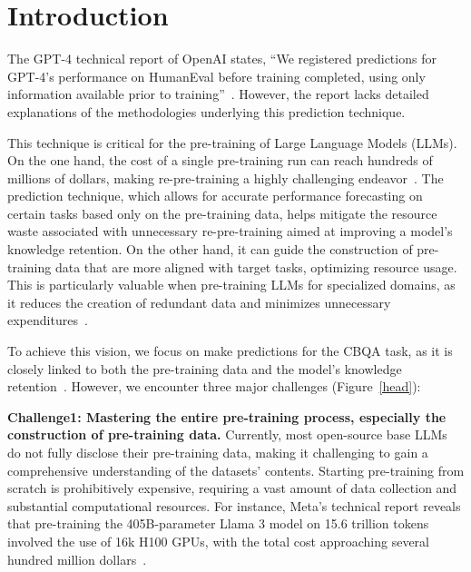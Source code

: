 





\section{Introduction}
\label{introduction}

The GPT-4 technical report of OpenAI states, ``We registered predictions for GPT-4’s performance on HumanEval before training completed, using only information available prior to training''~\cite{DBLP:journals/corr/abs-2107-03374, DBLP:journals/corr/abs-2303-08774}. However, the report lacks detailed explanations of the methodologies underlying this prediction technique.

This technique is critical for the pre-training of Large Language Models (LLMs). On the one hand, the cost of a single pre-training run can reach hundreds of millions of dollars, making re-pre-training a highly challenging endeavor~\cite{DBLP:journals/corr/abs-2401-04088, DBLP:journals/corr/abs-2407-10671, DBLP:journals/corr/abs-2407-21783}. The prediction technique, which allows for accurate performance forecasting on certain tasks based only on the pre-training data, helps mitigate the resource waste associated with unnecessary re-pre-training aimed at improving a model’s knowledge retention. On the other hand, it can guide the construction of pre-training data that are more aligned with target tasks, optimizing resource usage. This is particularly valuable when pre-training LLMs for specialized domains, as it reduces the creation of redundant data and minimizes unnecessary expenditures~\cite{Taoli-LLama, xiong2023doctorglm, li2024deeplearningllmbasedmethods}.

To achieve this vision, we focus on make predictions for the CBQA task, as it is closely linked to both the pre-training data and the model's knowledge retention~\cite{DBLP:conf/acl/WangL020, DBLP:conf/iclr/Sun0TYZ23}.
However, we encounter three major challenges (Figure~\ref{head}):

\textbf{Challenge1: Mastering the entire pre-training process, especially the construction of pre-training data.} Currently, most open-source base LLMs do not fully disclose their pre-training data, making it challenging to gain a comprehensive understanding of the datasets’ contents. Starting pre-training from scratch is prohibitively expensive, requiring a vast amount of data collection and substantial computational resources. For instance, Meta’s technical report reveals that pre-training the 405B-parameter Llama 3 model on 15.6 trillion tokens involved the use of 16k H100 GPUs, with the total cost approaching several hundred million dollars~\cite{DBLP:journals/corr/abs-2407-21783}.

